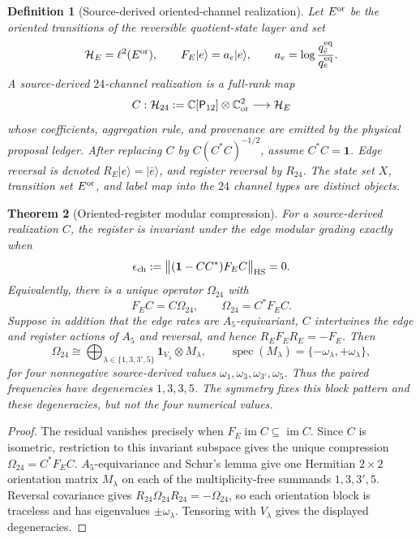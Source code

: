 \documentclass[11pt]{article}
\newtheorem{theorem}{Theorem}[section]
\newtheorem{definition}[theorem]{Definition}
\theoremstyle{remark}
\theoremstyle{plain}
\begin{document}
\begin{definition}[Source-derived oriented-channel realization]
\label{def:source-derived-channel-realization}
Let \(E^{\rm or}\) be the oriented transitions of the reversible quotient-state
layer and set
\[
 \mathcal H_E=\ell^2(E^{\rm or}),
 \qquad F_E|e\rangle=a_e|e\rangle,
 \qquad a_e=\log\frac{q_{\bar e}^{\rm eq}}{q_e^{\rm eq}}.
\]
A source-derived \(24\)-channel realization is a full-rank map
\[
 C:\mathcal H_{24}:=
 \mathbb C[\mathsf P_{12}]\otimes\mathbb C^2_{\rm or}
 \longrightarrow\mathcal H_E
\]
whose coefficients, aggregation rule, and provenance are emitted by the
physical proposal ledger.  After replacing \(C\) by
\(C(C^*C)^{-1/2}\), assume \(C^*C=\mathbf1\).  Edge reversal is denoted
\(R_E|e\rangle=|\bar e\rangle\), and register reversal by \(R_{24}\).
The state set \(X\), transition set \(E^{\rm or}\), and label map into the
\(24\) channel types are distinct objects.
\end{definition}

\begin{theorem}[Oriented-register modular compression]
\label{thm:oriented-register-modular-compression}
For a source-derived realization \(C\), the register is invariant under the
edge modular grading exactly when
\[
 \epsilon_{\rm ch}
 :=\bigl\|(\mathbf1-CC^*)F_EC\bigr\|_{\rm HS}=0.
\]
Equivalently, there is a unique operator \(\Omega_{24}\) with
\[
 F_EC=C\Omega_{24},
 \qquad
 \Omega_{24}=C^*F_EC.
\]
Suppose in addition that the edge rates are \(A_5\)-equivariant, \(C\)
intertwines the edge and register actions of \(A_5\) and reversal, and hence
\(R_EF_ER_E=-F_E\).  Then
\[
 \Omega_{24}
 \cong
 \bigoplus_{\lambda\in\{1,3,3',5\}}
 \mathbf1_{V_\lambda}\otimes M_\lambda,
 \qquad
 \operatorname{spec}(M_\lambda)=\{-\omega_\lambda,+\omega_\lambda\},
\]
for four nonnegative source-derived values \(\omega_1,\omega_3,\omega_{3'},
\omega_5\).  Thus the paired frequencies have degeneracies \(1,3,3,5\).
The symmetry fixes this block pattern and these degeneracies, but not the four
numerical values.
\end{theorem}

\begin{proof}
The residual vanishes precisely when \(F_E\operatorname{im}C\subseteq
\operatorname{im}C\).  Since \(C\) is isometric, restriction to this invariant
subspace gives the unique compression \(\Omega_{24}=C^*F_EC\).
\(A_5\)-equivariance and Schur's lemma give one Hermitian \(2\times2\)
orientation matrix \(M_\lambda\) on each of the multiplicity-free summands
\(1,3,3',5\).  Reversal covariance gives
\(R_{24}\Omega_{24}R_{24}=-\Omega_{24}\), so each orientation block is
traceless and has eigenvalues \(\pm\omega_\lambda\).  Tensoring with
\(V_\lambda\) gives the displayed degeneracies.
\end{proof}
\end{document}
